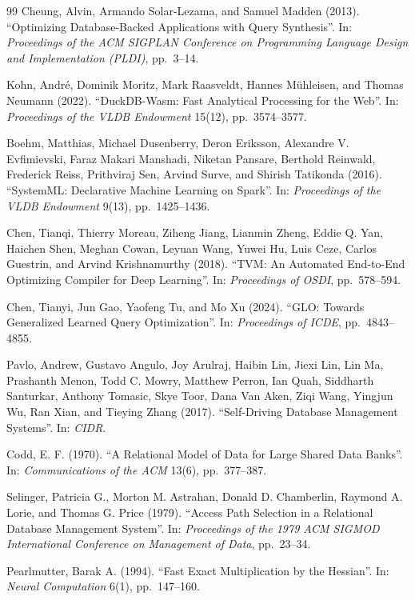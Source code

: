 \documentclass[12pt]{report}
\begin{document}
\begin{thebibliography}{99}
Cheung, Alvin, Armando Solar-Lezama,
and Samuel Madden (2013).
``Optimizing Database-Backed Applications with Query Synthesis''.
In: \textit{Proceedings of the ACM SIGPLAN Conference on Programming Language Design and Implementation (PLDI)},
pp.~3--14.


Kohn, Andr\'e, Dominik Moritz,
Mark Raasveldt, Hannes M{\"u}hleisen,
and Thomas Neumann (2022).
``DuckDB-Wasm: Fast Analytical Processing for the Web''.
In: \textit{Proceedings of the VLDB Endowment} 15(12),
pp.~3574--3577.

Boehm, Matthias, Michael Dusenberry,
Deron Eriksson, Alexandre V. Evfimievski,
Faraz Makari Manshadi, Niketan Pansare,
Berthold Reinwald, Frederick Reiss,
Prithviraj Sen, Arvind Surve,
and Shirish Tatikonda (2016).
``SystemML: Declarative Machine Learning on Spark''.
In: \textit{Proceedings of the VLDB Endowment} 9(13),
pp.~1425--1436.

Chen, Tianqi, Thierry Moreau,
Ziheng Jiang, Lianmin Zheng,
Eddie Q. Yan, Haichen Shen,
Meghan Cowan, Leyuan Wang,
Yuwei Hu, Luis Ceze,
Carlos Guestrin, and Arvind Krishnamurthy (2018).
``TVM: An Automated End-to-End Optimizing Compiler for Deep Learning''.
In: \textit{Proceedings of OSDI},
pp.~578--594.

Chen, Tianyi, Jun Gao,
Yaofeng Tu, and Mo Xu (2024).
``GLO: Towards Generalized Learned Query Optimization''.
In: \textit{Proceedings of ICDE},
pp.~4843--4855.

Pavlo, Andrew, Gustavo Angulo,
Joy Arulraj, Haibin Lin,
Jiexi Lin, Lin Ma,
Prashanth Menon, Todd C. Mowry,
Matthew Perron, Ian Quah,
Siddharth Santurkar, Anthony Tomasic,
Skye Toor, Dana Van Aken,
Ziqi Wang, Yingjun Wu,
Ran Xian, and Tieying Zhang (2017).
``Self-Driving Database Management Systems''.
In: \textit{CIDR}.

Codd, E. F. (1970).
``A Relational Model of Data for Large Shared Data Banks''.
In: \textit{Communications of the ACM} 13(6),
pp.~377--387.


Selinger, Patricia G., Morton M. Astrahan,
Donald D. Chamberlin, Raymond A. Lorie,
and Thomas G. Price (1979).
``Access Path Selection in a Relational Database Management System''.
In: \textit{Proceedings of the 1979 ACM SIGMOD International Conference on Management of Data},
pp.~23--34.


Pearlmutter, Barak A. (1994).
``Fast Exact Multiplication by the Hessian''.
In: \textit{Neural Computation} 6(1),
pp.~147--160.


\end{thebibliography}
\end{document}
